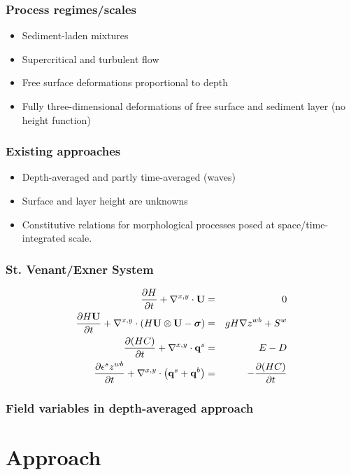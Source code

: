 \documentclass{beamer}
\begin{document}
\begin{frame}
\frametitle{Process regimes/scales}
\begin{itemize}
\item Sediment-laden mixtures
\item Supercritical and turbulent flow
\item Free surface deformations proportional to depth
\item Fully three-dimensional deformations of free surface and sediment layer (no height function)
\end{itemize}
\end{frame}

\begin{frame}
\frametitle{Existing approaches}
\begin{itemize}
\item Depth-averaged and partly time-averaged (waves)
\item Surface and layer height are unknowns
\item Constitutive relations for morphological processes posed at space/time-integrated scale.
\end{itemize}
\end{frame}

\begin{frame}
\frametitle{St. Venant/Exner System}
\begin{eqnarray}
  \pd{H}{t} + \nabla^{x,y} \cdot \vec U &=& 0\\ %
  \pd{H \vec U}{t} + \nabla^{x,y} \cdot \pl H \vec U \otimes \vec U - \ten{\sigma} \pr  &=& g H \grad{z^{wb}} + S^w \\ %
  \pd{\pl H C \pr}{t} + \nabla^{x,y}\cdot \vec q^s &=& E - D \\ %
  \pd{\epsilon^s z^{wb}}{t} + \nabla^{x,y} \cdot \pl \vec q^s + \vec q^b \pr &=& - \pd{\pl H C \pr}{t} %
\end{eqnarray}
\end{frame}

\begin{frame}
\frametitle{Field variables in depth-averaged approach}
\begin{center}
  \def\svgwidth{\textwidth}
  
\end{center}
\end{frame}

\section{Approach}
\end{document}
